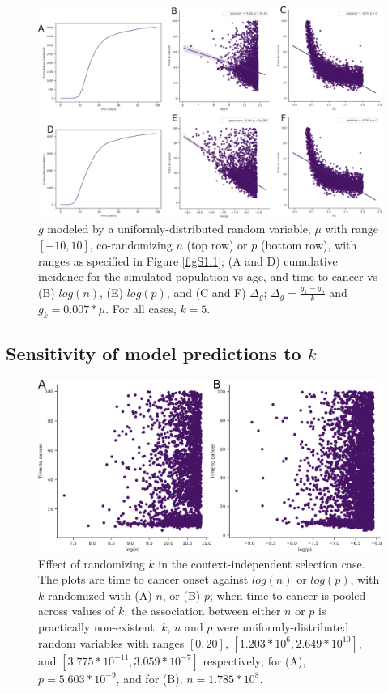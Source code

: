 \documentclass[9pt,twocolumn,twoside]{pnas-new}
\begin{document}
		\begin{figure}[tbhp]
			\centering
			\includegraphics[width=\linewidth, keepaspectratio=true]{figS1-2.png}
			\caption{$g$ modeled by a uniformly-distributed random variable, $\mu$ with range $[-10, 10]$, co-randomizing $n$ (top row) or $p$ (bottom row), with ranges as specified in Figure \ref{figS1.1}; (A and D) cumulative incidence for the simulated population vs age, and time to cancer vs (B) $log(n)$, (E) $log(p)$, and (C and F) $\Delta_{g}$; $\Delta_{g} = \frac{g_{k}-g_{0}}{k}$ and $g_{k} = 0.007*\mu$. For all cases, $k=5$.}
			\label{figS1.2}
		\end{figure}

	\subsection{Sensitivity of model predictions to $k$}\label{S2 Text}
		\renewcommand{\thefigure}{S2.\arabic{figure}}
		\setcounter{figure}{0}
		\begin{figure}[tbhp]
			\centering
			\includegraphics[width=\linewidth, keepaspectratio=true]{figS2-1.png}
			\caption{Effect of randomizing $k$ in the context-independent selection case. The plots are time to cancer onset against $log(n)$ or $log(p)$, with $k$ randomized with (A) $n$, or (B) $p$; when time to cancer is pooled across values of $k$, the association between either $n$ or $p$ is practically non-existent. $k$, $n$ and $p$ were uniformly-distributed random variables with ranges $[0, 20]$, $[1.203*10^{6}, 2.649*10^{10}]$, and $[3.775*10^{-11}, 3.059*10^{-7}]$ respectively; for (A), $p=5.603*10^{-9}$, and for (B), $n=1.785*10^{8}$.}
			\label{figS2.1}
		\end{figure}
\end{document}

